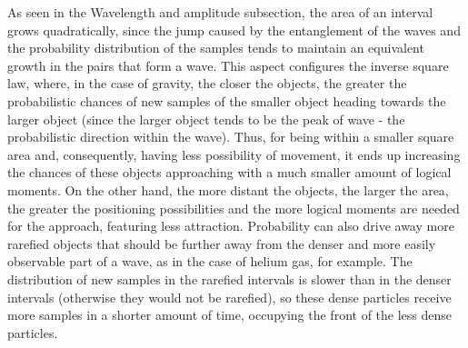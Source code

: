 As seen in the Wavelength and amplitude subsection, the area of an interval grows quadratically, since the jump caused by the entanglement of the waves and the probability distribution of the samples tends to maintain an equivalent growth in the pairs that form a wave. This aspect configures the inverse square law, where, in the case of gravity, the closer the objects, the greater the probabilistic chances of new samples of the smaller object heading towards the larger object (since the larger object tends to be the peak of wave - the probabilistic direction within the wave). Thus, for being within a smaller square area and, consequently, having less possibility of movement, it ends up increasing the chances of these objects approaching with a much smaller amount of logical moments. On the other hand, the more distant the objects, the larger the area, the greater the positioning possibilities and the more logical moments are needed for the approach, featuring less attraction. Probability can also drive away more rarefied objects that should be further away from the denser and more easily observable part of a wave, as in the case of helium gas, for example. The distribution of new samples in the rarefied intervals is slower than in the denser intervals (otherwise they would not be rarefied), so these dense particles receive more samples in a shorter amount of time, occupying the front of the less dense particles.


